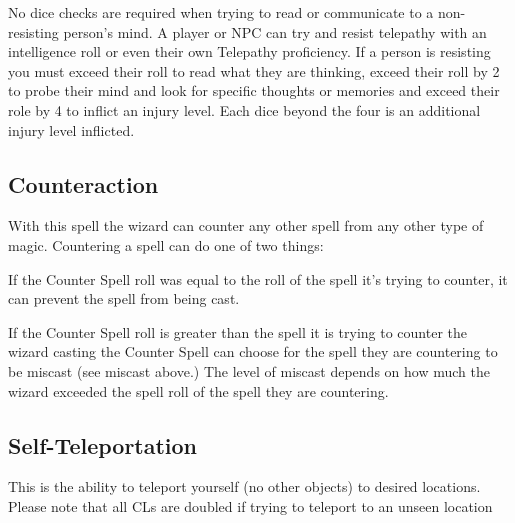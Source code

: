 No dice checks are required when trying to read or communicate to a non-resisting person’s mind. A player or NPC can try and resist telepathy with an intelligence roll or even their own Telepathy proficiency. If a person is resisting you must exceed their roll to read what they are thinking, exceed their roll by 2 to probe their mind and look for specific thoughts or memories and exceed their role by 4 to inflict an injury level. Each dice beyond the four is an additional injury level inflicted.

\subsection{Counteraction}

With this spell the wizard can counter any other spell from any other type of magic. Countering a spell can do one of two things:

If the Counter Spell roll was equal to the roll of the spell it’s trying to counter, it can prevent the spell from being cast.

If the Counter Spell roll is greater than the spell it is trying to counter the wizard casting the Counter Spell can choose for the spell they are countering to be miscast (see miscast above.) The level of miscast depends on how much the wizard exceeded the spell roll of the spell they are countering.

\subsection{Self-Teleportation}

This is the ability to teleport yourself (no other objects) to desired locations. Please note that all CLs are doubled if trying to teleport to an unseen location

